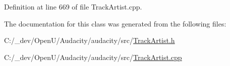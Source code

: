 Definition at line 669 of file Track\+Artist.\+cpp.



The documentation for this class was generated from the following files\+:\begin{DoxyCompactItemize}
\item 
C\+:/\+\_\+dev/\+Open\+U/\+Audacity/audacity/src/\hyperlink{_track_artist_8h}{Track\+Artist.\+h}\item 
C\+:/\+\_\+dev/\+Open\+U/\+Audacity/audacity/src/\hyperlink{_track_artist_8cpp}{Track\+Artist.\+cpp}\end{DoxyCompactItemize}
